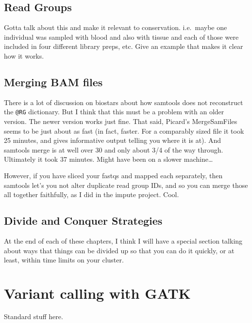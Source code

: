 \documentclass[]{krantz}
\begin{document}
\hypertarget{read-groups}{%
\section{Read Groups}\label{read-groups}}

Gotta talk about this and make it relevant to conservation. i.e.~maybe one individual was sampled with blood and also with tissue and each of those were included in four different library preps, etc. Give an example that makes it
clear how it works.

\hypertarget{merging-bam-files}{%
\section{Merging BAM files}\label{merging-bam-files}}

There is a lot of discussion on biostars about how samtools does not reconstruct the
\texttt{@RG} dictionary. But I think that this must be a problem with an older version. The
newer version works just fine. That said, Picard's MergeSamFiles seems to be just about
as fast (in fact, faster. For a comparably sized file it took 25 minutes, and gives informative
output telling you where it is at). And samtools merge is at well over 30 and only about
3/4 of the way through. Ultimately it took 37 minutes. Might have been on a slower machine\ldots{}

However, if you have sliced your fastqs and mapped each separately, then
samtools let's you not alter duplicate read group IDs, and so you can merge
those all together faithfully, as I did in the impute project. Cool.

\hypertarget{divide-and-conquer-strategies}{%
\section{Divide and Conquer Strategies}\label{divide-and-conquer-strategies}}

At the end of each of these chapters, I think I will
have a special section talking about ways that things can be divided
up so that you can do it quickly, or at least, within time limits
on your cluster.

\hypertarget{variant-calling-with-gatk}{%
\chapter{Variant calling with GATK}\label{variant-calling-with-gatk}}

Standard stuff here.
\end{document}
